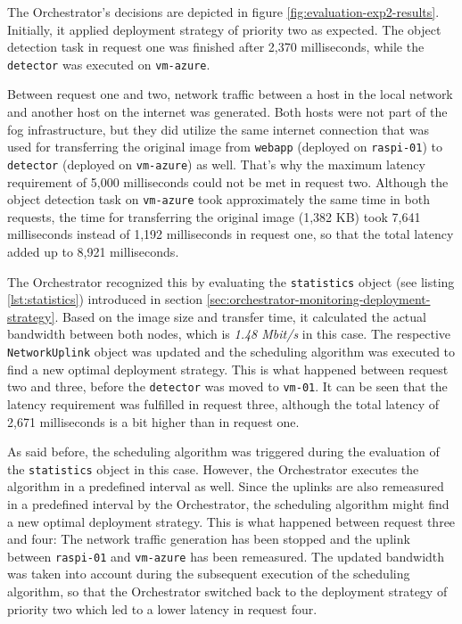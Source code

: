 The Orchestrator's decisions are depicted in figure \ref{fig:evaluation-exp2-results}. 
Initially, it applied deployment strategy of priority two as expected.
The object detection task in request one was finished after 2,370 milliseconds, while the \texttt{detector} was executed on \texttt{vm-azure}.

Between request one and two, network traffic between a host in the local network and another host on the internet was generated.
Both hosts were not part of the fog infrastructure, but they did utilize the same internet connection that was used for transferring the original image from \texttt{webapp} (deployed on \texttt{raspi-01}) to \texttt{detector} (deployed on \texttt{vm-azure}) as well.
That's why the maximum latency requirement of 5,000 milliseconds could not be met in request two.
Although the object detection task on \texttt{vm-azure} took approximately the same time in both requests, the time for transferring the original image (1,382 KB) took 7,641 milliseconds instead of 1,192 milliseconds in request one, so that the total latency added up to 8,921 milliseconds.

The Orchestrator recognized this by evaluating the \texttt{statistics} object (see listing \ref{lst:statistics}) introduced in section \ref{sec:orchestrator-monitoring-deployment-strategy}.
Based on the image size and transfer time, it calculated the actual bandwidth between both nodes, which is \textit{1.48 Mbit/s} in this case.
The respective \texttt{NetworkUplink} object was updated and the scheduling algorithm was executed to find a new optimal deployment strategy.
This is what happened between request two and three, before the \texttt{detector} was moved to \texttt{vm-01}.
It can be seen that the latency requirement was fulfilled in request three, although the total latency of 2,671 milliseconds is a bit higher than in request one.

As said before, the scheduling algorithm was triggered during the evaluation of the \texttt{statistics} object in this case.
However, the Orchestrator executes the algorithm in a predefined interval as well.
Since the uplinks are also remeasured in a predefined interval by the Orchestrator, the scheduling algorithm might find a new optimal deployment strategy.
This is what happened between request three and four:
The network traffic generation has been stopped and the uplink between \texttt{raspi-01} and \texttt{vm-azure} has been remeasured.
The updated bandwidth was taken into account during the subsequent execution of the scheduling algorithm, so that the Orchestrator switched back to the deployment strategy of priority two which led to a lower latency in request four.

